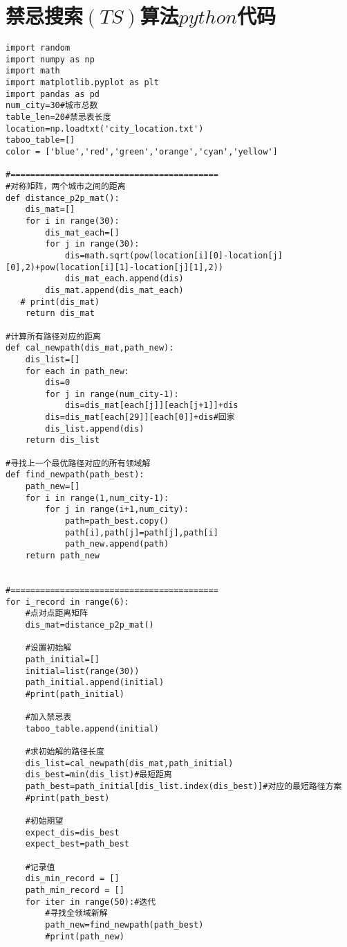 \section{禁忌搜索$(TS)$算法$python$代码}
\begin{lstlisting}
import random
import numpy as np
import math
import matplotlib.pyplot as plt
import pandas as pd
num_city=30#城市总数
table_len=20#禁忌表长度
location=np.loadtxt('city_location.txt')
taboo_table=[]
color = ['blue','red','green','orange','cyan','yellow']

#==========================================
#对称矩阵，两个城市之间的距离
def distance_p2p_mat():
    dis_mat=[]
    for i in range(30):
        dis_mat_each=[]
        for j in range(30):
            dis=math.sqrt(pow(location[i][0]-location[j][0],2)+pow(location[i][1]-location[j][1],2))
            dis_mat_each.append(dis)
        dis_mat.append(dis_mat_each)
   # print(dis_mat)
    return dis_mat

#计算所有路径对应的距离
def cal_newpath(dis_mat,path_new):
    dis_list=[]
    for each in path_new:
        dis=0
        for j in range(num_city-1):
            dis=dis_mat[each[j]][each[j+1]]+dis
        dis=dis_mat[each[29]][each[0]]+dis#回家
        dis_list.append(dis)
    return dis_list

#寻找上一个最优路径对应的所有领域解
def find_newpath(path_best):
    path_new=[]
    for i in range(1,num_city-1):
        for j in range(i+1,num_city):
            path=path_best.copy()
            path[i],path[j]=path[j],path[i]
            path_new.append(path)
    return path_new


#==========================================
for i_record in range(6):
    #点对点距离矩阵
    dis_mat=distance_p2p_mat()

    #设置初始解
    path_initial=[]
    initial=list(range(30))
    path_initial.append(initial)
    #print(path_initial)

    #加入禁忌表
    taboo_table.append(initial)

    #求初始解的路径长度
    dis_list=cal_newpath(dis_mat,path_initial)
    dis_best=min(dis_list)#最短距离
    path_best=path_initial[dis_list.index(dis_best)]#对应的最短路径方案
    #print(path_best)

    #初始期望
    expect_dis=dis_best
    expect_best=path_best

    #记录值
    dis_min_record = []
    path_min_record = []
    for iter in range(50):#迭代
        #寻找全领域新解
        path_new=find_newpath(path_best)
        #print(path_new)


\end{lstlisting}
